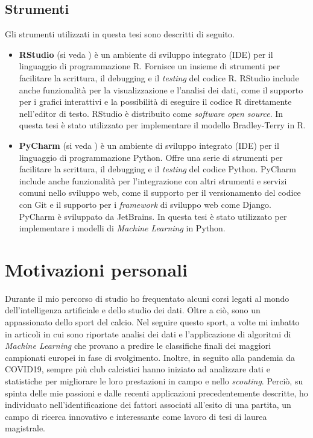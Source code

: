 \subsection{Strumenti}
Gli strumenti utilizzati in questa tesi sono descritti di seguito.
\begin{itemize}
	\item \textbf{RStudio} (si veda \textit{\cite{rstudio}}) è un ambiente di sviluppo integrato (IDE) per il linguaggio di programmazione R. Fornisce un insieme di strumenti per facilitare la scrittura, il debugging e il \emph{testing} del codice R. RStudio include anche funzionalità per la visualizzazione e l'analisi dei dati, come il supporto per i grafici interattivi e la possibilità di eseguire il codice R direttamente nell'editor di testo. RStudio è distribuito come \emph{software} \emph{open source}. In questa tesi è stato utilizzato per implementare il modello Bradley-Terry in R.
	\item \textbf{PyCharm} (si veda \textit{\cite{pycharm}}) è un ambiente di sviluppo integrato (IDE) per il linguaggio di programmazione Python. Offre una serie di strumenti per facilitare la scrittura, il debugging e il \emph{testing} del codice Python. PyCharm include anche funzionalità per l'integrazione con altri strumenti e servizi comuni nello sviluppo web, come il supporto per il versionamento del codice con Git e il supporto per i \emph{framework} di sviluppo web come Django. PyCharm  è sviluppato da JetBrains. In questa tesi è stato utilizzato per implementare i modelli di \emph{Machine Learning} in Python.
\end{itemize}

\section{Motivazioni personali}
Durante il mio percorso di studio ho frequentato alcuni corsi legati al mondo dell'intelligenza artificiale e dello studio dei dati. Oltre a ciò, sono un appassionato dello sport del calcio. Nel seguire questo sport, a volte mi imbatto in articoli in cui sono riportate analisi dei dati e l'applicazione di algoritmi di \emph{Machine Learning} che provano a predire le classifiche finali dei maggiori campionati europei in fase di svolgimento. Inoltre, in seguito alla pandemia da COVID19, sempre più club calcistici hanno iniziato ad analizzare dati e statistiche per migliorare le loro prestazioni in campo e nello \emph{scouting}. Perciò, su spinta delle mie passioni e dalle recenti applicazioni precedentemente descritte, ho individuato nell'identificazione dei fattori associati all'esito di una partita, un campo di ricerca innovativo e interessante come lavoro di tesi di laurea magistrale.
